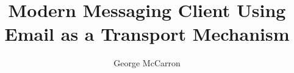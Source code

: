 \documentclass[a4paper,12pt,oneside]{report}
\begin{document}
\title{Modern Messaging Client Using Email as a Transport Mechanism}

\author{George McCarron}
\submitdate{\today}

\normallinespacing
\maketitle


\preface
\clearpage
{}




\body








\clearpage
{}
{}


\mediumlinespacing





\end{document}
